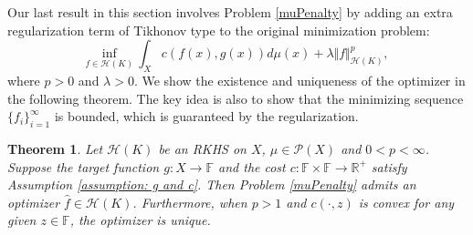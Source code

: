 \documentclass{amsart}
\numberwithin{equation}{section}
\theoremstyle{plain}
\newtheorem{theorem}[subsection]{Theorem}
\theoremstyle{remark}
\theoremstyle{definition}
\begin{document}
Our last result in this section involves Problem \ref{muPenalty} by adding an extra regularization term of Tikhonov type to the original minimization problem:
\begin{equation*}
    \underset{f \in \mathscr{H}(K)}{\text{inf}} \ \int_{X} c(f(x),g(x))  d\mu(x)+ \lambda \Vert f \Vert_{\mathscr{H}(K)}^p,
\end{equation*}
where $p>0$ and $\lambda>0$. We show the existence and uniqueness of the optimizer in the following theorem. The key idea is also to show that the minimizing sequence $\{f_i\}_{i=1}^{\infty}$ is bounded, which is guaranteed by the regularization.  
\begin{theorem}\label{muPenaltyThm}
Let $\mathscr{H}(K)$ be an RKHS on $X$, $\mu \in \mathscr{P}(X)$ and $0 < p <\infty$. Suppose the target function $g:X\to \mathbb{F}$ and the cost $c:\mathbb{F} \times \mathbb{F} \rightarrow \mathbb{R}^{+}$ satisfy Assumption \ref{assumption: g and c}.
Then Problem \ref{muPenalty}
admits an optimizer $\hat{f} \in \mathscr{H}(K)$. 
Furthermore,  when $p> 1$ and $c(\cdot,z)$ is convex for any given $z \in \mathbb{F}$, the optimizer is unique. 
\end{theorem}
\end{document}
